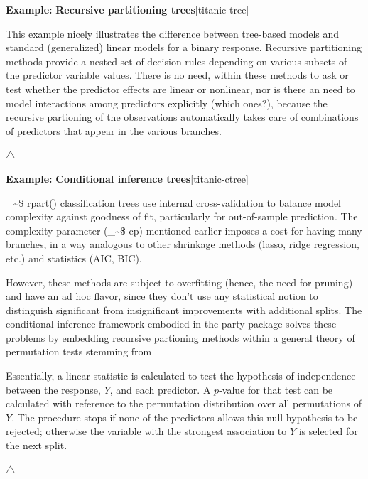 \documentclass{article}
\makeatletter
\newcommand\code{\bgroup\@makeother\_\@makeother\~\@makeother\$\@codex}
\def\@codex#1{{\normalfont\ttfamily\hyphenchar\font=-1 #1}\egroup}
\newcommand{\func}[1]{\code{#1()}}
\newcommand{\pkg}[1]{\textsf{#1}\nocite{R-#1}}
\newcommand{\Rpackage}[1]{\pkg{#1} package}
\newenvironment{Example}[2][unnamed-example]%
  {\medskip\noindent\textbf{\textsf{Example:}}
   \textbf{#2}\hfill [#1]\par\smallskip
  }
  {\hfill $\triangle$}
\makeatother
\begin{document}
\begin{Example}[titanic-tree]{Recursive partitioning trees}
This example nicely illustrates the difference between tree-based models
and standard (generalized) linear models for a binary response.
Recursive partitioning methods provide a nested set of decision rules 
depending on various subsets of the predictor variable values.
There is no need, within these methods to ask or test whether 
the predictor effects are linear or nonlinear, nor is there an need
to model interactions among predictors explicitly (which ones?),
because the recursive partioning of the observations automatically
takes care of combinations of predictors that appear in the various
branches.


\end{Example}

\begin{Example}[titanic-ctree]{Conditional inference trees}

\func{rpart} classification trees use internal cross-validation
to balance model complexity against goodness of fit, particularly
for out-of-sample prediction. The complexity parameter (\code{cp})
mentioned earlier imposes a cost for having many branches,
in a way analogous to other shrinkage methods (lasso, ridge regression, etc.)
and statistics (AIC, BIC).

However, these methods are subject to overfitting (hence, the need for
pruning) and have an ad hoc flavor, since they don't use any 
statistical notion to distinguish significant from insignificant
improvements with additional splits.
The conditional inference framework embodied in the \Rpackage{party}
solves these problems by embedding recursive partioning methods within
a general theory of permutation tests stemming from
\citet{StrasserWeber:1999}

Essentially, a linear statistic is calculated to test the hypothesis
of independence between the response, $Y$, and each predictor.  A $p$-value
for that test can be calculated with reference to the permutation
distribution over all permutations of $Y$. The procedure stops if
none of the predictors allows this null hypothesis to be rejected;
otherwise the variable with the strongest association to $Y$ is
selected for the next split.



\end{Example}
\end{document}
